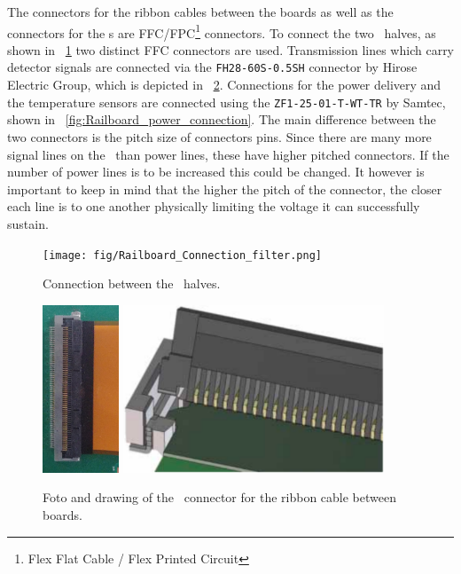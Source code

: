 \documentclass[../BTOF_summary.tex]{subfiles}
\begin{document}
The connectors for the ribbon cables between the boards as well as the connectors for the \sensorboard s are FFC/FPC\footnote{Flex Flat Cable / Flex Printed Circuit} connectors.
To connect the two \railboard\ halves, as shown in \fig ~\ref{fig:Railboard_connection} two distinct FFC connectors are used.
Transmission lines which carry detector signals are connected via the \texttt{FH28-60S-0.5SH} connector by Hirose Electric Group, which is depicted in \fig~\ref{fig:Railboard_connector}.
Connections for the power delivery and the temperature sensors are connected using the \texttt{ZF1-25-01-T-WT-TR} by Samtec, shown in \fig~\ref{fig:Railboard_power_connection}.
The main difference between the two connectors is the pitch size of connectors pins.
Since there are many more signal lines on the \railboard\ than power lines, these have higher pitched connectors.
If the number of power lines is to be increased this could be changed.
It however is important to keep in mind that the higher the pitch of the connector, the closer each line is to one another physically limiting the voltage it can successfully sustain.

\begin{figure}[htbp]
	\centering
	\texttt{[image: fig/Railboard\_Connection\_filter.png]}
	\caption{Connection between the \railboard\ halves.}
	\label{fig:Railboard_connection}
\end{figure}

\begin{figure}[htbp]
	\centering
	\includegraphics[height=5cm]{fig/LargeConnector_cable_crop.jpg}
	\includegraphics[height=5cm]{fig/hirose_connector_drawing.png}
	\caption{Foto and drawing of the \railboard\ connector for the ribbon cable between boards.}
	\label{fig:Railboard_connector}
\end{figure}
\end{document}
